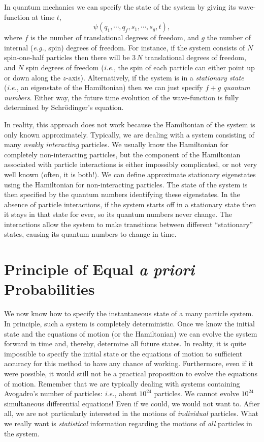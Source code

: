 In quantum mechanics we can specify the state of
the system by giving its wave-function at time $t$,
\begin{equation}
 \psi(q_1,\cdots, q_f, s_1,\cdots, s_g, t),
\end{equation}
 where $f$ is the number of translational degrees of freedom,
and $g$ the number of internal ({\em e.g.}, spin)
degrees of freedom. For instance, if the system
consists of $N$ spin-one-half particles then there will be $3\,N$ translational
degrees of freedom, and 
$N$ spin degrees of freedom
({\em i.e.}, the spin of each particle can either point up or down along the 
$z$-axis). Alternatively, if the system is in a {\em stationary
state}\/ ({\em i.e.},  an eigenstate of the Hamiltonian) then we can just
 specify $f+g$ {\em quantum numbers}. Either way, the future 
time evolution of the wave-function
is fully determined by Schr\"{o}dinger's equation.

In reality, this approach does not work because the Hamiltonian of the system is 
only 
known approximately. Typically, we are dealing with a system consisting of many
{\em weakly interacting}\/ particles. We usually know the Hamiltonian for completely
non-interacting particles, but the component of the Hamiltonian associated 
with  particle interactions is either impossibly complicated, or not very well
known (often, it is both!). We can define approximate stationary eigenstates
using the Hamiltonian for non-interacting particles. The state of the system is
then specified by the quantum numbers identifying these eigenstates. In the absence
of particle interactions, if the system starts off 
in a stationary state then it 
stays in that state for ever, so its quantum numbers never change. The interactions
allow the system to make transitions between different ``stationary''
states, causing its quantum numbers to change in time. 

\section{Principle of Equal {\em a priori}\/ Probabilities}
We now know how to specify the instantaneous state of a many particle system.
In principle, such a system is completely 
deterministic. Once we know the initial state and
the equations of motion (or the
Hamiltonian) we can evolve the system forward in time and, thereby, determine all
future states. In reality, it is quite impossible to specify
the initial state or the equations of motion  to sufficient accuracy for this method 
to have any chance of working.
 Furthermore, even if it were possible, it would still not be a practical 
proposition to evolve the equations of motion. 
Remember that we are typically dealing with systems
containing Avogadro's number of particles: {\em i.e.},  about $10^{24}$ particles.
We cannot evolve $10^{24}$ simultaneous differential equations! Even if we
could, we would not want to. After all, we are not particularly
interested in the motions of 
{\em individual}
particles. What we really want is {\em statistical}\/ information regarding the
motions of {\em all}\/ particles in the system.

